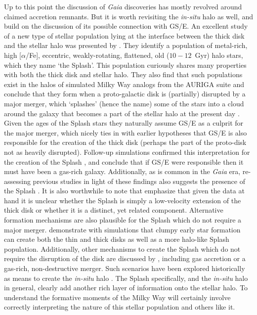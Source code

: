 Up to this point the discussion of \textit{Gaia} discoveries has mostly revolved around claimed accretion remnants. But it is worth revisiting the \textit{in-situ} halo as well, and build on the discussion of its possible connection with GS/E. An excellent study of a new type of stellar population lying at the interface between the thick disk and the stellar halo was presented by \textcite{belokurov20}. They identify a population of metal-rich, high [$\alpha$/Fe], eccentric, weakly-rotating, flattened, old ($10-12$~Gyr) halo stars, which they name `the Splash'. This population curiously shares many properties with both the thick disk and stellar halo. They also find that such populations exist in the halos of simulated Milky Way analogs from the AURIGA suite and conclude that they form when a proto-galactic disk is (partially) disrupted by a major merger, which `splashes' (hence the name) some of the stars into a cloud around the galaxy that becomes a part of the stellar halo at the present day \parencite[for a theoretical proposal of such a mechanism see][]{mccarthy12}. Given the ages of the Splash stars they naturally assume GS/E as a culprit for the major merger, which nicely ties in with earlier hypotheses that GS/E is also responsible for the creation of the thick disk (perhaps the part of the proto-disk not as heavily disrupted). Follow-up simulations confirmed this interpretation for the creation of the Splash \parencite{grand20,renaud21}, and conclude that if GS/E were responsible then it must have been a gas-rich galaxy. Additionally, as is common in the \textit{Gaia} era, re-assessing previous studies in light of these findings also suggests the presence of the Splash \parencite[e.g.][]{bonaca17,dimatteo19,gallart19,amarante20a}. It is also worthwhile to note that \textcite{belokurov20} emphasize that given the data at hand it is unclear whether the Splash is simply a low-velocity extension of the thick disk or whether it is a distinct, yet related component. Alternative formation mechanisms are also plausible for the Splash which do not require a major merger. \textcite{amarante20b} demonstrate with simulations that clumpy early star formation can create both the thin and thick disks as well as a more halo-like Splash population. Additionally, other mechanisms to create the Splash which do not require the disruption of the disk are discussed by \textcite{belokurov20}, including gas accretion or a gas-rich, non-destructive merger. Such scenarios have been explored historically as means to create the \textit{in-situ} halo \parencite[see][]{cooper15}. The Splash specifically, and the \textit{in-situ} halo in general, clearly add another rich layer of information onto the stellar halo. To understand the formative moments of the Milky Way will certainly involve correctly interpreting the nature of this stellar population and others like it.

